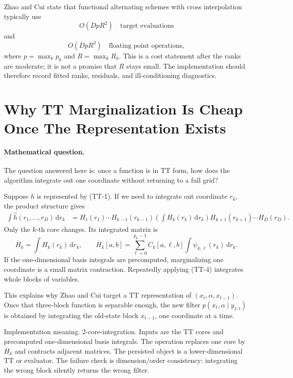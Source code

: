 \documentclass[11pt]{article}
\newcommand{\dd}{\,\mathrm d}
\begin{document}
Zhao and Cui \cite{zhao2024ttsequential} state that functional alternating schemes with cross interpolation
typically use
\[
    O(DpR^2)\quad\text{target evaluations}
    \label{eq:p24-tt-10}
\]
and
\[
    O(DpR^3)\quad\text{floating point operations},
    \label{eq:p24-tt-11}
\]
where \(p=\max_k p_k\) and \(R=\max_k R_k\).  This is a cost statement after
the ranks are moderate; it is not a promise that \(R\) stays small.  The
implementation should therefore record fitted ranks, residuals, and
ill-conditioning diagnostics.

\section{Why TT Marginalization Is Cheap Once The Representation Exists}

\paragraph{Mathematical question.}
The question answered here is: once a function is in TT form, how does the
algorithm integrate out one coordinate without returning to a full grid?

Suppose \(h\) is represented by (TT-1).  If we need to integrate out coordinate
\(r_k\), the product structure gives
\[
\begin{aligned}
 \int \widehat h(r_1,\ldots,r_D)\dd r_k
 &=
 H_1(r_1)\cdots H_{k-1}(r_{k-1})
 \left(\int H_k(r_k)\dd r_k\right)
 H_{k+1}(r_{k+1})\cdots H_D(r_D).
\end{aligned}
\label{eq:p24-tt-4}
\]
Only the \(k\)-th core changes.  Its integrated matrix is
\[
    \overline H_k
    =
    \int H_k(r_k)\dd r_k,\qquad
    \overline H_k[a,b]
    =
    \sum_{\ell=0}^{p_k-1} C_k[a,\ell,b]
    \int \psi_{k,\ell}(r_k)\dd r_k.
    \label{eq:p24-tt-5}
\]
If the one-dimensional basis integrals are precomputed, marginalizing one
coordinate is a small matrix contraction.  Repeatedly applying (TT-4) integrates
whole blocks of variables.

This explains why Zhao and Cui \cite{zhao2024ttsequential} target a TT representation of
\((x_t,\alpha,x_{t-1})\).  Once that three-block function is separable enough,
the new filter \(p(x_t,\alpha\mid y_{1:t})\) is obtained by integrating the
old-state block \(x_{t-1}\), one coordinate at a time.

Implementation meaning. 2-core-integration.  Inputs are the TT cores and
precomputed one-dimensional basis integrals.  The operation replaces one core
by \(\overline H_k\) and contracts adjacent matrices.  The persisted object is a
lower-dimensional TT or evaluator.  The failure check is dimension/order
consistency: integrating the wrong block silently returns the wrong filter.
\end{document}
